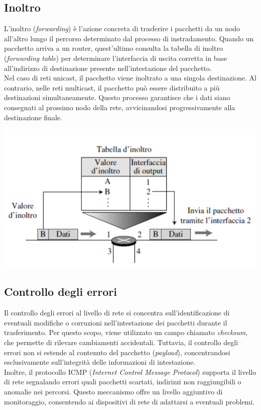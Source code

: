 \documentclass[12pt]{report}
\begin{document}
	\subsection{Inoltro}
	L'inoltro (\textit{forwarding}) è l'azione concreta di trasferire i pacchetti da un nodo all'altro lungo il percorso determinato dal processo di instradamento. Quando un pacchetto arriva a un router, quest'ultimo consulta la tabella di inoltro (\textit{forwarding table}) per determinare l'interfaccia di uscita corretta in base all'indirizzo di destinazione presente nell'intestazione del pacchetto.
	\vspace{\baselineskip}\\
	Nel caso di reti unicast, il pacchetto viene inoltrato a una singola destinazione. Al contrario, nelle reti multicast, il pacchetto può essere distribuito a più destinazioni simultaneamente. Questo processo garantisce che i dati siano consegnati al prossimo nodo della rete, avvicinandosi progressivamente alla destinazione finale.
	
	\begin{center}
		\includegraphics[scale=0.6]{assets/inoltro.png}
	\end{center}

	\subsection{Controllo degli errori}
	Il controllo degli errori al livello di rete si concentra sull'identificazione di eventuali modifiche o corruzioni nell'intestazione dei pacchetti durante il trasferimento. Per questo scopo, viene utilizzato un campo chiamato \textit{checksum}, che permette di rilevare cambiamenti accidentali. Tuttavia, il controllo degli errori non si estende al contenuto del pacchetto (\textit{payload}), concentrandosi esclusivamente sull'integrità delle informazioni di intestazione.
	\vspace{\baselineskip}\\
	Inoltre, il protocollo ICMP (\textit{Internet Control Message Protocol}) supporta il livello di rete segnalando errori quali pacchetti scartati, indirizzi non raggiungibili o anomalie nei percorsi. Questo meccanismo offre un livello aggiuntivo di monitoraggio, consentendo ai dispositivi di rete di adattarsi a eventuali problemi.
	
\end{document}
